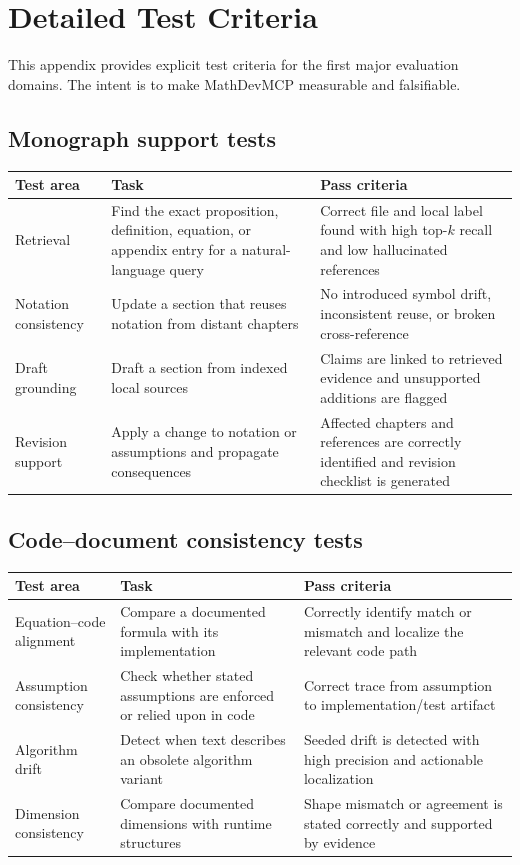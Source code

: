 \chapter{Detailed Test Criteria}

This appendix provides explicit test criteria for the first major evaluation domains. The intent is to make MathDevMCP measurable and falsifiable.

\section{Monograph support tests}

\begin{longtable}{p{}p{}p{}}
\toprule
\textbf{Test area} & \textbf{Task} & \textbf{Pass criteria} \\
\midrule
Retrieval & Find the exact proposition, definition, equation, or appendix entry for a natural-language query & Correct file and local label found with high top-$k$ recall and low hallucinated references \\
Notation consistency & Update a section that reuses notation from distant chapters & No introduced symbol drift, inconsistent reuse, or broken cross-reference \\
Draft grounding & Draft a section from indexed local sources & Claims are linked to retrieved evidence and unsupported additions are flagged \\
Revision support & Apply a change to notation or assumptions and propagate consequences & Affected chapters and references are correctly identified and revision checklist is generated \\
\bottomrule
\end{longtable}

\section{Code--document consistency tests}

\begin{longtable}{p{}p{}p{}}
\toprule
\textbf{Test area} & \textbf{Task} & \textbf{Pass criteria} \\
\midrule
Equation--code alignment & Compare a documented formula with its implementation & Correctly identify match or mismatch and localize the relevant code path \\
Assumption consistency & Check whether stated assumptions are enforced or relied upon in code & Correct trace from assumption to implementation/test artifact \\
Algorithm drift & Detect when text describes an obsolete algorithm variant & Seeded drift is detected with high precision and actionable localization \\
Dimension consistency & Compare documented dimensions with runtime structures & Shape mismatch or agreement is stated correctly and supported by evidence \\
\bottomrule
\end{longtable}

